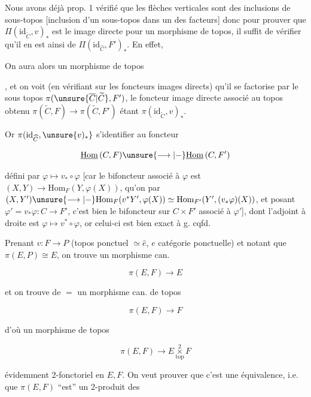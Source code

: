 Nous avons déjà   prop. 1 vérifié que les flèches verticales sont des inclusions de sous-topos [inclusion d'un sous-topos  dans un des facteurs] donc pour prouver que $\Pi(\mathrm{id}_{\widetilde C},v)_*$ est le  image directe pour un morphisme de topos, il suffit de vérifier qu'il en est ainsi de $\Pi(\mathrm{id}_{\widehat C},F')_*$. En effet,

On aura alors un morphisme de topos


, et on voit (en vérifiant sur les foncteurs images directs) qu'il se factorise par le sous topos $\pi(\unsure{\overline C|\widetilde C},F')$, le foncteur image directe associé au   topos obtenu $\pi(\widetilde C,F)\longrightarrow\pi(\widetilde C,F')$ étant $\pi(\mathrm{id}_{\widetilde C},v)_*$.

Or $\pi(\mathrm{id}_{\widehat C},\unsure{v)_*}$  s'identifier au foncteur

\[
\underline{\mathrm{Hom}}\,(C,F)\unsure{\longrightarrow|-}\underline{\mathrm{Hom}}\,(C,F')
\]

défini par  $\varphi\longmapsto v_*\circ\varphi$ [car le bifoncteur associé à $\varphi$ est \deleted{\unsure{$\varphi$}} $(X,Y)\to\mathrm{Hom}_F(Y,\varphi(X))$, qu'on  par  $(X,Y')\unsure{\longrightarrow|-}\mathrm{Hom}_F(v^*Y',\varphi(X))\simeq\mathrm{Hom}_{F'}(Y',(v_*\varphi)(X))$, et posant $\varphi'=v_*\varphi\colon C\longrightarrow F'$, c'est bien le bifoncteur sur $C\times F'$ associé à $\varphi'$], dont l'adjoint à droite est $\varphi\longmapsto v^*\circ\varphi$, or celui-ci est bien exact à g. \qquad cqfd.

Prenant $v\colon F\longrightarrow P$ (topos ponctuel $\simeq\widehat e$, $e$ catégorie ponctuelle) et notant que $\pi(E,P)\cong E$, on trouve un morphisme can.

\[
\pi(E,F)\longrightarrow E
\]

et on trouve de $=$ un morphisme can. de topos

\[
\pi(E,F)\longrightarrow F
\]

d'où un morphisme de topos

\[
\pi(E,F)\longrightarrow E\mathbin{\underset{\mathrm{top}}{\overset{2}{\times}}}F
\]

évidemment 2-fonctoriel en $E,F$. On veut prouver que c'est une  équivalence, i.e. que $\pi(E,F)$ ``est'' un 2-produit des

